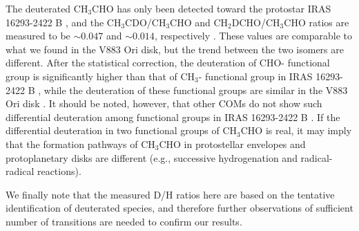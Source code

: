 \documentclass[linenumbers, twocolumn, twocolappendix, astrosymb, times]{aastex631}
\newcommand{\methanol}{CH$_3$OH\xspace}
\newcommand{\acetaldehyde}{CH$_3$CHO\xspace}
\newcommand{\methylformate}{CH$_3$OCHO\xspace}
\begin{document}
The deuterated \acetaldehyde has only been detected toward the protostar IRAS 16293-2422 B \citep{Coudert2019}, and the CH$_3$CDO/\acetaldehyde and CH$_2$DCHO/\acetaldehyde ratios are measured to be $\sim0.047$ and $\sim0.014$, respectively \citep{Manigand2020}. These values are comparable to what we found in the V883 Ori disk, but the trend between the two isomers are different. After the statistical correction, the deuteration of CHO- functional group is significantly higher than that of CH$_3$- functional group in IRAS 16293-2422 B \citep{Manigand2020}, while the deuteration of these functional groups are similar in the V883 Ori disk . It should be noted, however, that other COMs do not show such differential deuteration among functional groups in IRAS 16293-2422 B \citep{Jorgensen2018}. If the differential deuteration in two functional groups of \acetaldehyde is real, it may imply that the formation pathways of \acetaldehyde in protostellar envelopes and protoplanetary disks are different (e.g., successive hydrogenation and radical-radical reactions). 

We finally note that the measured D/H ratios here are based on the tentative identification of deuterated species, and therefore further observations of sufficient number of transitions are needed to confirm our results.




\begin{figure*}
\caption{The KDE of the posterior probability density distributions of D/H ratios for \methanol (blue), \acetaldehyde (orange), and \methylformate (green). For \acetaldehyde and \methylformate, two different isomers of deuterated species (CH$_3$CDO and CH$_2$DCHO) have been observed. The probability density is normalized by the peak being unity and offset for visual clarity. The gray-shaded region indicates the range of typical values for CH$_2$DOH/\methanol ratios measured in warm protostellar envelopes.}
\label{fig:DH}
\end{figure*}
\end{document}
